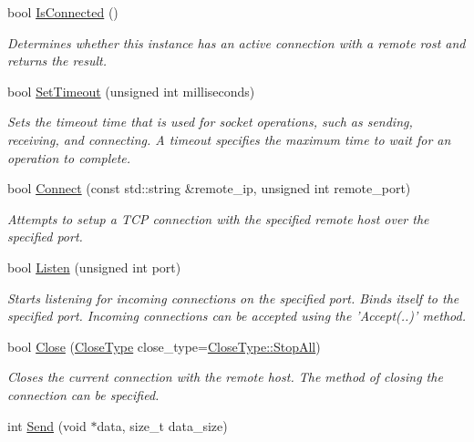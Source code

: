 \begin{DoxyCompactItemize}
bool \hyperlink{class_senergy_1_1_socket_a6d22575e6fc0d6ab4a61097d60b6e773}{Is\-Connected} ()
\begin{DoxyCompactList}\small\item\em Determines whether this instance has an active connection with a remote rost and returns the result. \end{DoxyCompactList}\item 
bool \hyperlink{class_senergy_1_1_socket_a7ca3e4fb2e2f216773498e6f29e9ea14}{Set\-Timeout} (unsigned int milliseconds)
\begin{DoxyCompactList}\small\item\em Sets the timeout time that is used for socket operations, such as sending, receiving, and connecting. A timeout specifies the maximum time to wait for an operation to complete. \end{DoxyCompactList}\item 
bool \hyperlink{class_senergy_1_1_socket_a75946ce55f263abb105a22611819e11e}{Connect} (const std\-::string \&remote\-\_\-ip, unsigned int remote\-\_\-port)
\begin{DoxyCompactList}\small\item\em Attempts to setup a T\-C\-P connection with the specified remote host over the specified port. \end{DoxyCompactList}\item 
bool \hyperlink{class_senergy_1_1_socket_a9f2cfa080e3a5f365b52cc5fff94eb74}{Listen} (unsigned int port)
\begin{DoxyCompactList}\small\item\em Starts listening for incoming connections on the specified port. Binds itself to the specified port. Incoming connections can be accepted using the 'Accept(..)' method. \end{DoxyCompactList}\item 
bool \hyperlink{class_senergy_1_1_socket_a859e2c4eec6792215f04363404658b0a}{Close} (\hyperlink{class_senergy_1_1_socket_a88ed1eb1a5c47ea1b395715aabd37ab4}{Close\-Type} close\-\_\-type=\hyperlink{class_senergy_1_1_socket_a88ed1eb1a5c47ea1b395715aabd37ab4a40b522922220c34afd8e1d4a3ba02208}{Close\-Type\-::\-Stop\-All})
\begin{DoxyCompactList}\small\item\em Closes the current connection with the remote host. The method of closing the connection can be specified. \end{DoxyCompactList}\item 
int \hyperlink{class_senergy_1_1_socket_aa475d6aa0daf4d73ce627bce6ee04849}{Send} (void $\ast$data, size\-\_\-t data\-\_\-size)

\end{DoxyCompactItemize}
